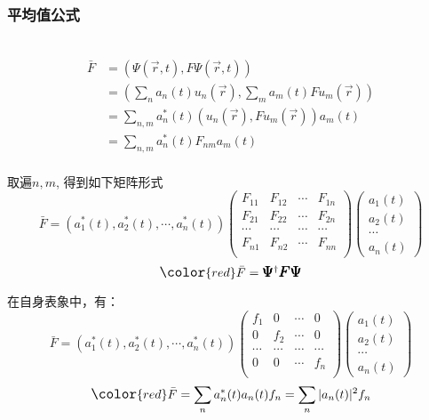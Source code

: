 \begin{frame} 
    \frametitle{平均值公式}
    \解~ 
    \begin{equation*}
        \begin{split}
            \bar{F}&=(\Psi(\vec{r},t), F\Psi(\vec{r},t)) \\
            &= (\sum_n a_n(t) u_n(\vec{r}), \sum_m a_m(t) F u_m(\vec{r}))\\
            &= \sum_{n,m} a_n ^*(t) (u_n(\vec{r}), F u_m(\vec{r})) a_m(t)\\
            &= \sum_{n,m} a_n ^*(t) F_{nm} a_m(t)\\
        \end{split} 
    \end{equation*}
\end{frame}

\begin{frame} 
    取遍$n, m$, 得到如下矩阵形式\\
    $$\bar{F} =(a_1 ^*(t), a_2 ^*(t),\cdots,a_n^*(t) )
    \begin{pmatrix}
       F_{11} & F_{12} & \cdots & F_{1n} \\
       F_{21} & F_{22} & \cdots & F_{2n} \\
       \cdots & \cdots &  \cdots& \cdots\\
        F_{n1} & F_{n2} & \cdots & F_{nn} \\
    \end{pmatrix}
    \begin{pmatrix}
        a_1(t)\\
        a_2(t)\\
        \cdots \\
        a_n(t)
    \end{pmatrix}
    $$ \vspace{1.0em} 
    $$ \large \color{red} \bar{F} = \pmb {\Psi} ^{\dagger } \pmb {F} \pmb {\Psi} $$
\end{frame}

\begin{frame} 
    在自身表象中，有：
    $$\bar{F} =(a_1 ^*(t), a_2 ^*(t),\cdots,a_n^*(t) )
    \begin{pmatrix}
       f_1 & 0 & \cdots & 0 \\
       0& f_2 & \cdots & 0 \\
       \cdots & \cdots &  \cdots& \cdots\\
        0 & 0 & \cdots & f_n \\
    \end{pmatrix}
    \begin{pmatrix}
        a_1(t)\\
        a_2(t)\\
        \cdots \\
        a_n(t)
    \end{pmatrix}
    $$
    \vspace{1.0em} 
    $$ \large \color{red} \bar{F} = \sum_n a_n^*(t) a_n(t) f_n= \sum_n |a_n(t)|^2 f_n $$
\end{frame}

